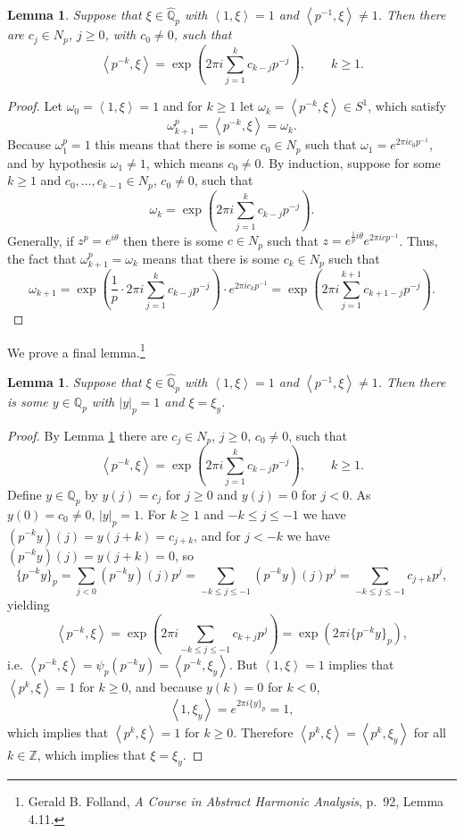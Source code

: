 \documentclass{article}
\newcommand{\inner}[2]{\left\langle #1, #2 \right\rangle}
\newtheorem{lemma}[theorem]{Lemma}
\theoremstyle{definition}
\begin{document}
\begin{lemma}
Suppose that $\xi \in \widehat{\mathbb{Q}}_p$ with $\inner{1}{\xi}=1$ and $\inner{p^{-1}}{\xi} \neq 1$. Then there
are $c_j \in N_p$, $j \geq 0$, with $c_0 \neq 0$, such that
\[
\inner{p^{-k}}{\xi} = \exp\left(2\pi i\sum_{j=1}^k c_{k-j} p^{-j} \right),\qquad k \geq 1.
\]
\label{lemma410}
\end{lemma}
\begin{proof}
Let $\omega_0=\inner{1}{\xi}=1$ and 
for $k \geq 1$ let $\omega_k = \inner{p^{-k}}{\xi} \in S^1$, which satisfy
\[
\omega_{k+1}^p = \inner{p^{-k}}{\xi} = \omega_k.
\]
Because $\omega_1^p=1$ this means that there is some
$c_0 \in N_p$ such that $\omega_1 = e^{2\pi ic_0 p^{-1}}$, and
by hypothesis $\omega_1 \neq 1$, which means $c_0 \neq 0$. By induction, suppose for
some $k \geq 1$ and $c_0,\ldots,c_{k-1} \in N_p$, $c_0 \neq 0$, such that  
\[
\omega_k = \exp\left( 2\pi i\sum_{j=1}^k c_{k-j} p^{-j} \right).
\]
Generally, if $z^p = e^{i\theta}$ then there is some $c \in N_p$ such that
$z = e^{\frac{1}{p} i\theta} e^{2\pi i cp^{-1}}$. 
Thus, the fact that $\omega_{k+1}^p = \omega_k$ means that 
there is some $c_k \in N_p$ such that
\[
\omega_{k+1} = \exp\left( \frac{1}{p} \cdot 2\pi i\sum_{j=1}^k c_{k-j} p^{-j} \right) \cdot e^{2\pi ic_k p^{-1}}
=\exp\left(2\pi i\sum_{j=1}^{k+1} c_{k+1-j} p^{-j} \right).
\]
\end{proof}

We prove a final lemma.\footnote{Gerald B. Folland, {\em A Course in Abstract Harmonic
Analysis}, p.~92, Lemma 4.11.}


\begin{lemma}
Suppose that $\xi \in \widehat{\mathbb{Q}}_p$ with $\inner{1}{\xi}=1$ and $\inner{p^{-1}}{\xi} \neq 1$. 
Then there is some $y \in \mathbb{Q}_p$ with $|y|_p=1$ and $\xi=\xi_y$.
\label{lemma411}
\end{lemma}
\begin{proof}
By Lemma \ref{lemma410} there are $c_j \in N_p$, $j \geq 0$, $c_0 \neq 0$, such that 
\[
\inner{p^{-k}}{\xi} = \exp\left(2\pi i\sum_{j=1}^k c_{k-j} p^{-j} \right),\qquad k \geq 1.
\]
Define $y \in \mathbb{Q}_p$ by $y(j) = c_j$ for $j \geq 0$ and $y(j)=0$ for $j<0$. As $y(0)=c_0 \neq 0$, $|y|_p=1$. 
For $k \geq 1$ and $-k \leq j \leq -1$ we have 
$(p^{-k}y)(j) = y(j+k) = c_{j+k}$, and for $j<-k$ we have $(p^{-k}y)(j)=y(j+k)=0$, so
\[
\{p^{-k}y\}_p = \sum_{j<0} (p^{-k}y)(j) p^j = \sum_{-k \leq j \leq -1}  (p^{-k}y)(j) p^j
=\sum_{-k \leq j \leq -1} c_{j+k} p^j,
\]
yielding
\[
\inner{p^{-k}}{\xi}
=\exp\left(2\pi i\sum_{-k \leq j \leq -1} c_{k+j} p^j\right)
=\exp(2\pi i \{p^{-k}y\}_p),
\]
i.e.  $\inner{p^{-k}}{\xi} = \psi_p(p^{-k}y) = \inner{p^{-k}}{\xi_y}$. 
But $\inner{1}{\xi}=1$ implies that $\inner{p^k}{\xi}=1$ for $k \geq 0$, and because
$y(k)=0$ for $k<0$,
\[
\inner{1}{\xi_y} = e^{2\pi i\{y\}_p} = 1,
\]
which implies that $\inner{p^k}{\xi}=1$ for $k \geq 0$. 
Therefore $\inner{p^k}{\xi}=\inner{p^k}{\xi_y}$ for all $k \in \mathbb{Z}$, which implies that $\xi=\xi_y$. 
\end{proof}
\end{document}
